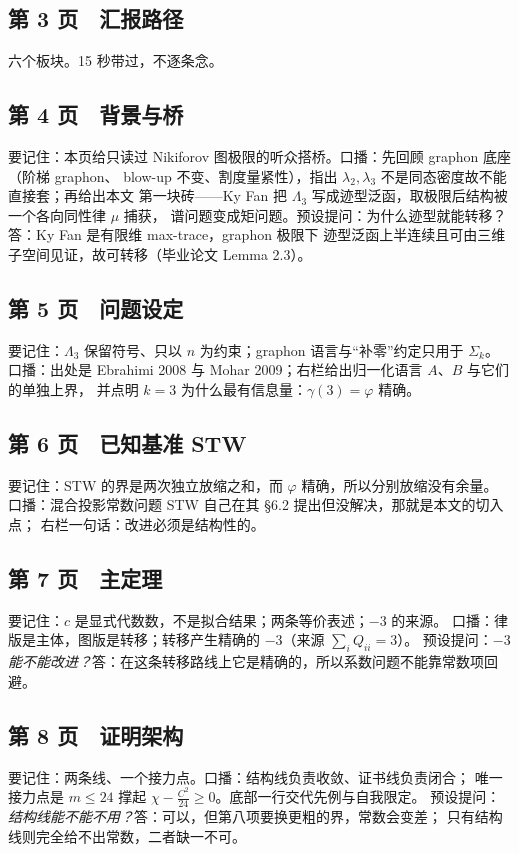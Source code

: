 \documentclass[UTF8,11pt]{ctexart}
\newcommand{\Lam}{\Lambda}
\begin{document}
\subsection*{第 3 页　汇报路径}
六个板块。15 秒带过，不逐条念。

\subsection*{第 4 页　背景与桥}
要记住：本页给只读过 Nikiforov 图极限的听众搭桥。口播：先回顾 graphon 底座（阶梯 graphon、
blow-up 不变、割度量紧性），指出 $\lambda_2,\lambda_3$ 不是同态密度故不能直接套；再给出本文
第一块砖——Ky Fan 把 $\Lambda_3$ 写成迹型泛函，取极限后结构被一个各向同性律 $\mu$ 捕获，
谱问题变成矩问题。预设提问：为什么迹型就能转移？答：Ky Fan 是有限维 max-trace，graphon 极限下
迹型泛函上半连续且可由三维子空间见证，故可转移（毕业论文 Lemma 2.3）。

\subsection*{第 5 页　问题设定}
要记住：$\Lam_3$ 保留符号、只以 $n$ 为约束；graphon 语言与``补零''约定只用于 $\Sigma_k$。
口播：出处是 Ebrahimi 2008 与 Mohar 2009；右栏给出归一化语言 $A$、$B$ 与它们的单独上界，
并点明 $k=3$ 为什么最有信息量：$\gamma(3)=\varphi$ 精确。

\subsection*{第 6 页　已知基准 STW}
要记住：STW 的界是两次独立放缩之和，而 $\varphi$ 精确，所以分别放缩没有余量。
口播：混合投影常数问题 STW 自己在其 \S6.2 提出但没解决，那就是本文的切入点；
右栏一句话：改进必须是结构性的。

\subsection*{第 7 页　主定理}
要记住：$c$ 是显式代数数，不是拟合结果；两条等价表述；$-3$ 的来源。
口播：律版是主体，图版是转移；转移产生精确的 $-3$（来源 $\sum_iQ_{ii}=3$）。
预设提问：\emph{$-3$ 能不能改进？}答：在这条转移路线上它是精确的，所以系数问题不能靠常数项回避。

\subsection*{第 8 页　证明架构}
要记住：两条线、一个接力点。口播：结构线负责收敛、证书线负责闭合；
唯一接力点是 $m\le24$ 撑起 $\chi-\frac{C^2}{24}\ge0$。底部一行交代先例与自我限定。
预设提问：\emph{结构线能不能不用？}答：可以，但第八项要换更粗的界，常数会变差；
只有结构线则完全给不出常数，二者缺一不可。
\end{document}
